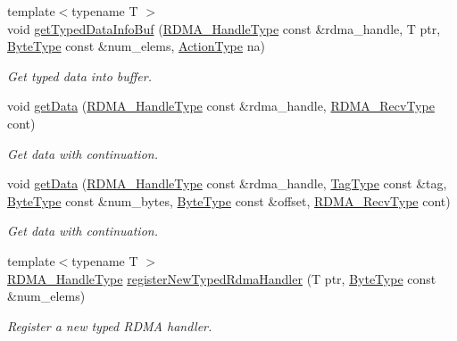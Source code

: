 \begin{DoxyCompactItemize}
{\footnotesize template$<$typename T $>$ }\\void \hyperlink{structvt_1_1rdma_1_1_r_d_m_a_manager_a59f4ee000f6c382289fa6c186962d1d1}{get\+Typed\+Data\+Info\+Buf} (\hyperlink{namespacevt_a10442579ec4e7ebef223818e64bcf908}{R\+D\+M\+A\+\_\+\+Handle\+Type} const \&rdma\+\_\+handle, T ptr, \hyperlink{namespacevt_aab8d55968084610ce3b17057981e9300}{Byte\+Type} const \&num\+\_\+elems, \hyperlink{namespacevt_ae0a5a7b18cc99d7b732cb4d44f46b0f3}{Action\+Type} na)
\begin{DoxyCompactList}\small\item\em Get typed data into buffer. \end{DoxyCompactList}\item 
void \hyperlink{structvt_1_1rdma_1_1_r_d_m_a_manager_aebefa1395f990efb66284adc1495f6d4}{get\+Data} (\hyperlink{namespacevt_a10442579ec4e7ebef223818e64bcf908}{R\+D\+M\+A\+\_\+\+Handle\+Type} const \&rdma\+\_\+handle, \hyperlink{namespacevt_1_1rdma_a36020f2b7ae371b6ddc8ec9caffb72d2}{R\+D\+M\+A\+\_\+\+Recv\+Type} cont)
\begin{DoxyCompactList}\small\item\em Get data with continuation. \end{DoxyCompactList}\item 
void \hyperlink{structvt_1_1rdma_1_1_r_d_m_a_manager_a214cf0d741a5dd197e12a3fcd6ea2c47}{get\+Data} (\hyperlink{namespacevt_a10442579ec4e7ebef223818e64bcf908}{R\+D\+M\+A\+\_\+\+Handle\+Type} const \&rdma\+\_\+handle, \hyperlink{namespacevt_a84ab281dae04a52a4b243d6bf62d0e52}{Tag\+Type} const \&tag, \hyperlink{namespacevt_aab8d55968084610ce3b17057981e9300}{Byte\+Type} const \&num\+\_\+bytes, \hyperlink{namespacevt_aab8d55968084610ce3b17057981e9300}{Byte\+Type} const \&offset, \hyperlink{namespacevt_1_1rdma_a36020f2b7ae371b6ddc8ec9caffb72d2}{R\+D\+M\+A\+\_\+\+Recv\+Type} cont)
\begin{DoxyCompactList}\small\item\em Get data with continuation. \end{DoxyCompactList}\item 
{\footnotesize template$<$typename T $>$ }\\\hyperlink{namespacevt_a10442579ec4e7ebef223818e64bcf908}{R\+D\+M\+A\+\_\+\+Handle\+Type} \hyperlink{structvt_1_1rdma_1_1_r_d_m_a_manager_a69d6fc1f017047de79f3c1190e55ac53}{register\+New\+Typed\+Rdma\+Handler} (T ptr, \hyperlink{namespacevt_aab8d55968084610ce3b17057981e9300}{Byte\+Type} const \&num\+\_\+elems)
\begin{DoxyCompactList}\small\item\em Register a new typed R\+D\+MA handler. \end{DoxyCompactList}\item 

\end{DoxyCompactItemize}
